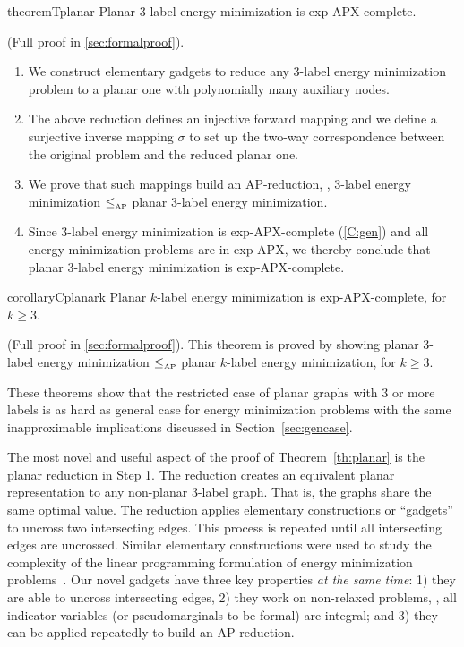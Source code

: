 \begin{restatable}{theorem}{Tplanar}\label{th:planar}
Planar 3-label energy minimization is exp-APX-complete.
\end{restatable}
\begin{proofsketch}
(Full proof in \cref{sec:formalproof}).
\begin{enumerate}
    \item We construct elementary gadgets to reduce any 3-label energy minimization problem to a planar one with polynomially many auxiliary nodes.
    \item The above reduction defines an injective forward mapping and we define a surjective inverse mapping $\sigma$ to set up the two-way correspondence between the original problem and the reduced planar one.
    \item We prove that such mappings build an AP-reduction, \ie, 3-label energy minimization $\mathbin{{\leq}_{\text{\tiny AP}}}$ planar 3-label energy minimization.
    \item Since 3-label energy minimization is exp-APX-complete (\cref{C:gen}) and all energy minimization problems are in exp-APX, we thereby conclude that planar 3-label energy minimization is exp-APX-complete.
\end{enumerate}
\end{proofsketch}
\begin{restatable}{corollary}{Cplanark}\label{C:planark}
Planar $k$-label energy minimization is exp-APX-complete, for $k \geq 3$.
\end{restatable}
\begin{proofsketch}
(Full proof in \cref{sec:formalproof}).
This theorem is proved by showing planar 3-label energy minimization $ \mathbin{{\leq}_{\text{\tiny AP}}}$ planar $k$-label energy minimization, for $k \geq 3$. 
\end{proofsketch}
These theorems show that the restricted case of planar graphs with 3 or more labels is as hard as general case for energy minimization problems with the same inapproximable implications discussed in Section~\ref{sec:gencase}.

The most novel and useful aspect of the proof of Theorem~\ref{th:planar} is the planar reduction in Step 1. The reduction creates an equivalent planar representation to any non-planar 3-label graph.  That is, the graphs share the same optimal value.  The reduction applies elementary constructions or ``gadgets'' to uncross two intersecting edges. This process is repeated until all intersecting edges are uncrossed. Similar elementary constructions were used to study the complexity of the linear programming formulation of energy minimization problems~\cite{prusa2015universality,prusa2015hard}.
Our novel gadgets have three key properties {\em at the same time}: 1) they are able to uncross intersecting edges, 2) they work on non-relaxed problems, \ie, all indicator variables (or pseudomarginals to be formal) are integral; and 3) they can be applied repeatedly to build an AP-reduction.


